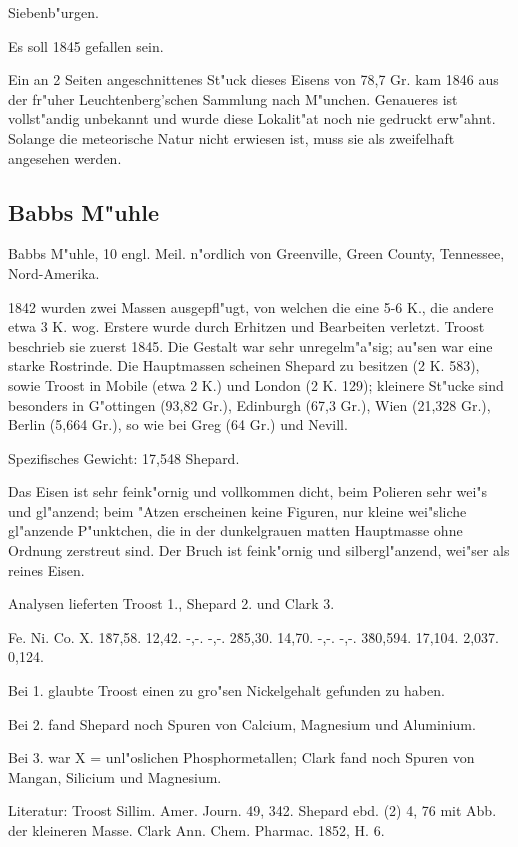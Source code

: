 \documentclass[a4paper, 11pt, oneside]{article}
\begin{document}
Siebenb"urgen.

Es soll 1845 gefallen sein.

Ein an 2 Seiten angeschnittenes St"uck dieses Eisens von 78,7 Gr. kam 1846 aus der fr"uher Leuchtenberg'schen Sammlung nach M"unchen. Genaueres ist vollst"andig unbekannt und wurde diese Lokalit"at noch nie gedruckt erw"ahnt. Solange die meteorische Natur nicht erwiesen ist, muss sie als zweifelhaft angesehen werden.

\subsection{Babbs M"uhle}

Babbs M"uhle, 10 engl. Meil. n"ordlich von Greenville, Green County, Tennessee, Nord-Amerika.

1842 wurden zwei Massen ausgepfl"ugt, von welchen die eine 5-6 K., die andere etwa 3 K. wog. Erstere wurde durch Erhitzen und Bearbeiten verletzt. Troost beschrieb sie zuerst 1845. Die Gestalt war sehr unregelm"a"sig; au"sen war eine starke Rostrinde. Die Hauptmassen scheinen Shepard zu besitzen (2 K. 583), sowie Troost in Mobile (etwa 2 K.) und London (2 K. 129); kleinere St"ucke sind besonders in G"ottingen (93,82 Gr.), Edinburgh (67,3 Gr.), Wien (21,328 Gr.), Berlin (5,664 Gr.), so wie bei Greg (64 Gr.) und Nevill.

Spezifisches Gewicht: 17,548 Shepard.

Das Eisen ist sehr feink"ornig und vollkommen dicht, beim Polieren sehr wei"s und gl"anzend; beim "Atzen erscheinen keine Figuren, nur kleine wei"sliche gl"anzende P"unktchen, die in der dunkelgrauen matten Hauptmasse ohne Ordnung zerstreut sind. Der Bruch ist feink"ornig und silbergl"anzend, wei"ser als reines Eisen.

Analysen lieferten Troost 1., Shepard 2. und Clark 3.

Fe. Ni. Co. X.  
1\. 87,58. 12,42. -,-. -,-.  
2\. 85,30. 14,70. -,-. -,-.  
3\. 80,594. 17,104. 2,037. 0,124.

Bei 1. glaubte Troost einen zu gro"sen Nickelgehalt gefunden zu haben.

Bei 2. fand Shepard noch Spuren von Calcium, Magnesium und Aluminium.

Bei 3. war X = unl"oslichen Phosphormetallen; Clark fand noch Spuren von Mangan, Silicium und Magnesium.

Literatur: Troost Sillim. Amer. Journ. 49, 342. Shepard ebd. (2) 4, 76 mit Abb. der kleineren Masse. Clark Ann. Chem. Pharmac. 1852, H. 6.
\end{document}
